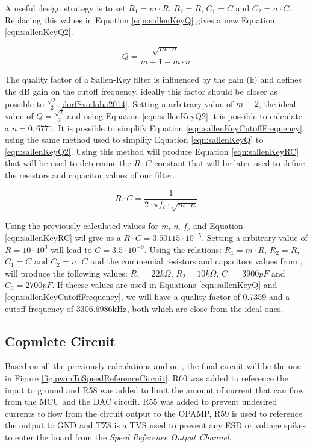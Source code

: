 		A useful design strategy is to set $R_{1}= m \cdot R$, $R_{2}=R$, $C_{1}=C$ and $C_{2}= n \cdot C$. Replacing this values in Equation \ref{eqn:sallenKeyQ} gives a new Equation \ref{eqn:sallenKeyQ2}.

		\begin{equation}\label{eqn:sallenKeyQ2}
			Q=\frac{\sqrt{m \cdot n}}{m + 1 - m \cdot n}
		\end{equation}

		The quality factor of a Sallen-Key filter is influenced by the gain (k) and defines the dB gain on the cutoff frequency, ideally this factor should be closer as possible to $\frac{\sqrt{2}}{2}$ \ref{dorfSvodoba2014}. Setting a arbitrary value of $m=2$, the ideal value of $Q=\frac{\sqrt{2}}{2}$ and using Equation \ref{eqn:sallenKeyQ2} it is possible to calculate a $n=0,6771$. It is possible to simplify Equation \ref{eqn:sallenKeyCutoffFrequency} using the same method used to simplify Equation \ref{eqn:sallenKeyQ} to \ref{eqn:sallenKeyQ2}. Using this method will produce Equation \ref{eqn:sallenKeyRC} that will be used to determine the $R \cdot C$ constant that will be later used to define the resistors and capacitor values of our filter. 

		\begin{equation}\label{eqn:sallenKeyRC}
			R \cdot C = \frac{1}{2 \cdot \pi f_{c} \cdot \sqrt{m \cdot n}}
		\end{equation}

		Using the previously calculated values for \textit{m}, \textit{n}, \textit{$f_{c}$} and Equation \ref{eqn:sallenKeyRC} wil give us a $R \cdot C = 3.50115 \cdot 10^{-5}$. Setting a arbitrary value of $R=10 \cdot 10^{3}$ will lead to $C=3.5 \cdot 10^{-9}$. Using the relations: $R_{1}= m \cdot R$, $R_{2}=R$, $C_{1}=C$ and $C_{2}= n \cdot C$ and the commercial resistors and capacitors values from \cite{burgess2015pwm}, will produce the following values: $R_{1}= 22k\Omega$, $R_{2}=10k\Omega$, $C_{1}=3900pF$ and $C_{2}= 2700pF$. If theese values are used in Equations \ref{eqn:sallenKeyQ} and \ref{eqn:sallenKeyCutoffFrequency}, we will have a  quality factor of 0.7359 and a cutoff frequency of 3306.6986kHz, both which are close from the ideal ones.

		\subsection{Copmlete Circuit}\label{ssec:pwm-to-speed-reference-circuit}
	
		Based on all the previously calculations and on \cite{texas1999sallenkey}, the final circuit will be the one in Figure \ref{fig:pwmToSpeedReferenceCircuit}. R60 was added to reference the input to ground and R58 was added to limit the amount of current that can flow from the MCU and the DAC circuit. R55 was added to prevent undesired currents to flow from the circuit output to the OPAMP, R59 is used to reference the output to GND and TZ8 is a TVS used to prevent any ESD or voltage spikes \cite{lepkowski2006evaluating} to enter the board from the \textit{Speed Reference Output Channel}.


